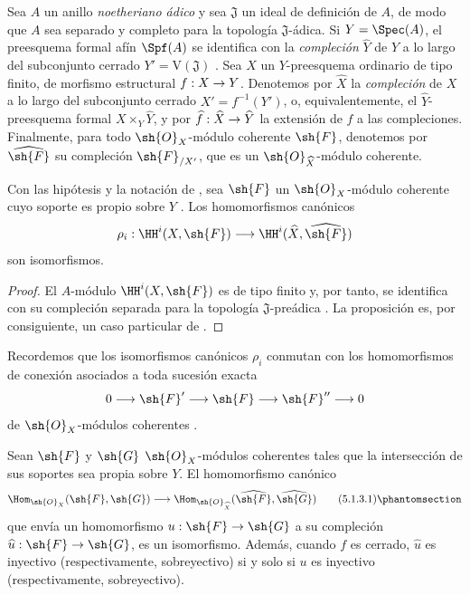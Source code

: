 \documentclass[oneside]{amsart}
\makeatletter
\newcommand{\ega@arrow}[2]{\mathchoice{#1}{#2}{#2}{#2}}
\renewcommand{\to}{\ega@arrow{\longrightarrow}{\rightarrow}}
\let\EGAOriginalLabel\label
\renewcommand{\label}[1]{\phantomsection\EGAOriginalLabel{#1}}
\makeatother
\begin{document}
\begin{env}[5.1.1]
\label{III.5.1.1}
Sea $A$ un anillo \emph{noetheriano ádico} y sea $\mathfrak{J}$ un ideal de
definición de $A$, de modo que $A$ sea separado y completo para la
topología $\mathfrak{J}$-ádica. Si $Y=\Spec(A)$, el preesquema formal
afín $\Spf(A)$ se identifica con la \emph{compleción}
$\widehat{Y}$ de $Y$ a lo largo del subconjunto cerrado
$Y'=\mathrm{V}(\mathfrak{J})$ . Sea $X$ un
$Y$-preesquema ordinario de tipo finito, de morfismo estructural
$f:X\to Y$. Denotemos por $\widehat{X}$ la \emph{compleción} de $X$ a lo largo
del subconjunto cerrado $X'=f^{-1}(Y')$, o, equivalentemente, el
$\widehat{Y}$-preesquema formal $X\times_Y\widehat{Y}$, y por
$\widehat{f}:\widehat{X}\to\widehat{Y}$ la extensión de $f$ a las
compleciones. Finalmente, para todo $\sh{O}_X$-módulo coherente
$\sh{F}$, denotemos por $\widehat{\sh{F}}$ su compleción
$\sh{F}_{/X'}$, que es un
$\sh{O}_{\widehat{X}}$-módulo coherente.
\end{env}

\begin{proposition}[5.1.2]
\label{III.5.1.2}
Con las hipótesis y la notación de , sea $\sh{F}$
un $\sh{O}_X$-módulo coherente cuyo soporte es propio sobre $Y$
. Los homomorfismos canónicos
\[
  \rho_i:
  \HH^i(X,\sh{F})
  \longrightarrow
  \HH^i(\widehat{X},\widehat{\sh{F}})
\]
son isomorfismos.
\end{proposition}

\begin{proof}
El $A$-módulo $\HH^i(X,\sh{F})$ es de tipo finito
 y, por tanto, se identifica con su compleción
separada para la topología $\mathfrak{J}$-preádica
. La proposición es, por consiguiente, un caso particular
de .
\end{proof}

Recordemos que los isomorfismos canónicos $\rho_i$ conmutan con los
homomorfismos de conexión asociados a toda sucesión exacta
\[
  0\longrightarrow\sh{F}'
  \longrightarrow\sh{F}
  \longrightarrow\sh{F}''
  \longrightarrow0
\]
de $\sh{O}_X$-módulos coherentes
 .

\begin{corollary}[5.1.3]
\label{III.5.1.3}
Sean $\sh{F}$ y $\sh{G}$ $\sh{O}_X$-módulos coherentes tales que
la intersección de sus soportes sea propia sobre $Y$. El
homomorfismo canónico
\[
  \Hom_{\sh{O}_X}(\sh{F},\sh{G})
  \longrightarrow
  \Hom_{\sh{O}_{\widehat{X}}}
  (\widehat{\sh{F}},\widehat{\sh{G}})
  \tag{5.1.3.1}
  \label{III.5.1.3.1.eq}
\]
que envía un homomorfismo $u:\sh{F}\to\sh{G}$ a su compleción
$\widehat{u}:\sh{F}\to\sh{G}$, es un
isomorfismo. Además, cuando $f$ es cerrado,
$\widehat{u}$ es inyectivo (\textup{respectivamente}, sobreyectivo) si y solo
si $u$ es inyectivo (respectivamente, sobreyectivo).
\end{corollary}
\end{document}
